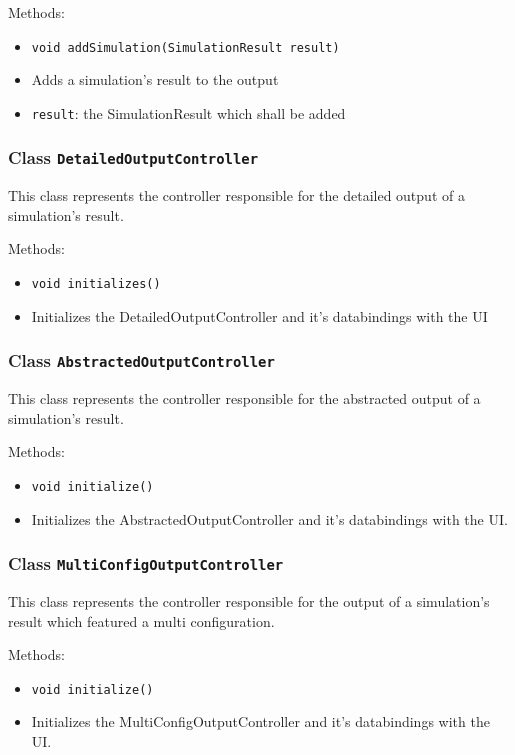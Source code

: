 \documentclass[parskip=full,11pt]{scrartcl}
\begin{document}
Methods:
\begin{itemize}\itemsep -10pt
\item \texttt{void addSimulation(SimulationResult result)}
\item[] Adds a simulation's result to the output
\item[] \texttt{result}: the SimulationResult which shall be added

\end{itemize}

\subsubsection{Class \texttt{DetailedOutputController}}
This class represents the controller responsible for the detailed output of a simulation's result.

Methods:
\begin{itemize}\itemsep -10pt
\item \texttt{void initializes()}
\item[] Initializes the DetailedOutputController and it's databindings with the UI
\end{itemize}

\subsubsection{Class \texttt{AbstractedOutputController}}
This class represents the controller responsible for the abstracted output of a simulation's result.

Methods:
\begin{itemize}\itemsep -10pt
\item \texttt{void initialize()}
\item[] Initializes the AbstractedOutputController and it's databindings with the UI.
\end{itemize}

\subsubsection{Class \texttt{MultiConfigOutputController}}
This class represents the controller responsible for the output of a simulation's result which featured a multi configuration.

Methods:
\begin{itemize}\itemsep -10pt
\item \texttt{void initialize()}
\item[] Initializes the MultiConfigOutputController and it's databindings with the UI.
\end{itemize}
\end{document}
